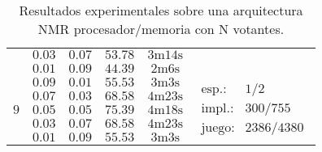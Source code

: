 \begin{table}
{\begin{tabular}{c!{\ }|!{\ }c!{\ }|!{\ }c!{\ }|!{\ }c!{\ }|!{\ }c!{\ }|!{\ }c}
      & $0.03$ & $0.07$ & $53.78$ & $3\text{m}14\text{s}$ \\
      & $0.01$ & $0.09$ & $44.39$ & $2\text{m}6\text{s}$ \\ 
       & $0.09$ & $0.01$ & $55.53$ & $3\text{m}3\text{s}$ &  \\  
      & $0.07$ & $0.03$ & $68.58$ & $4\text{m}23\text{s}$ \\ 
      & $0.05$ & $0.05$ & $75.39$ & $4\text{m}18\text{s}$ \\ 
      & $0.03$ & $0.07$ & $68.58$ & $4\text{m}23\text{s}$ \\ 
      & $0.01$ & $0.09$ & $55.53$ & $3\text{m}3\text{s}$ \\ \hline
    \end{tabular}
    }
    \caption{Resultados experimentales sobre una arquitectura NMR procesador/memoria con N votantes.}
    \label{table:resultsNMR2}
    \vspace{-.5cm}
\end{table}



